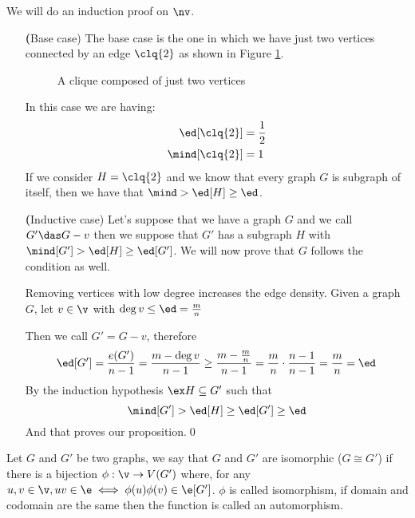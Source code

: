 \begin{prf}
    We will do an induction proof on $\nv$.
    \begin{itemize}
        \item[\textbf(Base case)] The base case is the one in which we have just two vertices connected by an edge $\clq{2}$ as shown in Figure \ref{fig:k_2}.
        \begin{figure}[h]
            \centering
            
            \caption{A clique composed of just two vertices}
            \label{fig:k_2}
        \end{figure}
        In this case we are having:
        \begin{align*}
            \ed[\clq{2}] &= \frac{1}{2} \\
            \mind[\clq{2}] &= 1
        \end{align*}
        If we consider $H = \clq{2}$ and we know that every graph $G$ is subgraph of itself, then we have that $\mind > \ed[H] \geq \ed$.
        \item[\textbf(Inductive case)] Let's suppose that we have a graph $G$ and we call $G' \das G - v$ then we suppose that $G'$ has a subgraph $H$ with $\mind[G'] > \ed[H] \geq \ed[G']$. We will now prove that $G$ follows the condition as well.
        
        Removing vertices with low degree increases the edge density. Given a graph $G$, let $v \in \v$ with $\deg{v} \leq \ed = \frac{m}{n}$

        Then we call $G' = G - v$, therefore
        \begin{equation*}
            \ed[G'] = \frac{e(G')}{n - 1} = \frac{m - \deg{v}}{n - 1} \geq \frac{m - \frac{m}{n}}{n - 1} = \frac{m}{n} \cdot \frac{n - 1}{n - 1} = \frac{m}{n} = \ed
        \end{equation*}
        By the induction hypothesis $\ex H \subseteq G'$ such that
        \begin{equation*}
            \mind[G'] > \ed[H] \geq \ed[G'] \geq \ed
        \end{equation*}
        And that proves our proposition.\qed
    \end{itemize}
\end{prf}
Let $G$ and $G'$ be two graphs, we say that $G$ and $G'$ are isomorphic ($G \cong G'$) if there is a bijection $\phi: \v \rightarrow V(G')$ where, for any $u, v \in \v, uv \in \e \iff \phi(u)\phi(v) \in \e[G']$. $\phi$ is called isomorphism, if domain and codomain are the same then the function is called an automorphism.
